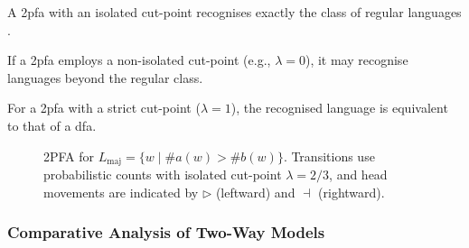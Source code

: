 \begin{theorem}
    \label{thm:2pfa-rabin}
    A \gls{2pfa} with an isolated cut-point recognises exactly the class of regular languages \cite{dwork1990time}.
\end{theorem}

\begin{proposition}
If a \gls{2pfa} employs a non-isolated cut-point (e.g., \(\lambda = 0\)), it may recognise languages beyond the regular class.
\end{proposition}

\begin{corollary}
For a \gls{2pfa} with a strict cut-point (\(\lambda = 1\)), the recognised language is equivalent to that of a \gls{dfa}.
\end{corollary}

\begin{figure}[h]
    \centering  
    \caption{2PFA for \(L_{\text{maj}} = \{w \mid \#a(w) > \#b(w)\}\). Transitions use probabilistic counts with isolated cut-point \(\lambda = 2/3\), and head movements are indicated by \(\triangleright\) (leftward) and \(\dashv\) (rightward).}
    \label{fig:2pfa-example}
\end{figure}


\subsubsection{Comparative Analysis of Two-Way Models}
\label{subsubsec:two-way-comparison}

